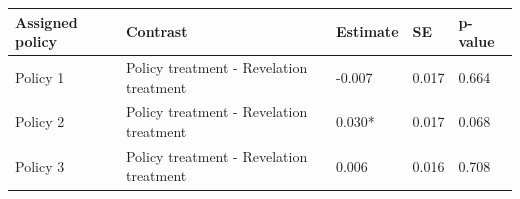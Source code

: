 \begin{tabular}{lllll}
\toprule
Assigned policy & Contrast & Estimate & SE & p-value\\
\midrule
Policy 1 & Policy treatment - Revelation treatment & -0.007 & 0.017 & 0.664\\
Policy 2 & Policy treatment - Revelation treatment & 0.030* & 0.017 & 0.068\\
Policy 3 & Policy treatment - Revelation treatment & 0.006 & 0.016 & 0.708\\
\bottomrule
\end{tabular}
